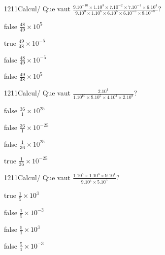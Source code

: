 \documentclass[11pt]{article}
\begin{document}
            \begin{question}{1211}{Calcul}{}{/}
                Que vaut $\frac{9.10^{-10}\times 1.10^{3}\times 7.10^{-2}\times 7.10^{-1}\times 6.10^{4}}{9.10^{0}\times 1.10^{6}\times 6.10^{6}\times 6.10^{-5}\times 8.10^{-8}}$?
            \end{question}
            
            \begin{reponses}
                \item[false] $\frac{48}{49}\times 10^{5}$
                \item[true] $\frac{49}{48}\times 10^{-5}$
                \item[false] $\frac{48}{49}\times 10^{-5}$
                \item[false] $\frac{49}{48}\times 10^{5}$
            \end{reponses}
            
            \begin{question}{1211}{Calcul}{}{/}
                Que vaut $\frac{2.10^{1}}{1.10^{10}\times 9.10^{5}\times 4.10^{3}\times 2.10^{8}}$?
            \end{question}
            
            \begin{reponses}
                \item[false] $\frac{36}{1}\times 10^{25}$
                \item[false] $\frac{36}{1}\times 10^{-25}$
                \item[false] $\frac{1}{36}\times 10^{25}$
                \item[true] $\frac{1}{36}\times 10^{-25}$
            \end{reponses}
            
            \begin{question}{1211}{Calcul}{}{/}
                Que vaut $\frac{1.10^{8}\times 1.10^{3}\times 9.10^{1}}{9.10^{4}\times 5.10^{5}}$?
            \end{question}
            
            \begin{reponses}
                \item[true] $\frac{1}{5}\times 10^{3}$
                \item[false] $\frac{1}{5}\times 10^{-3}$
                \item[false] $\frac{5}{1}\times 10^{3}$
                \item[false] $\frac{5}{1}\times 10^{-3}$
            \end{reponses}
            
\end{document}
